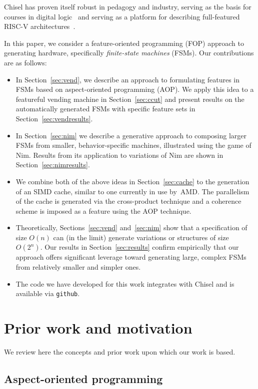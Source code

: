 \documentclass[conference]{IEEEtran}
\begin{document}
Chisel has proven itself robust in pedagogy and industry, serving as the basis for courses in digital logic~\cite{vlsicourse} and serving as a platform for describing full-featured RISC-V architectures~\cite{chisel:riscv}.  

In this paper, we consider a feature-oriented programming (FOP) approach to generating hardware, specifically \emph{finite-state machines} (FSMs).   Our contributions are as follows:
\begin{itemize}
    \item In Section~\ref{sec:vend}, we describe an approach to formulating features in FSMs based on aspect-oriented programming (AOP).  We apply this idea to a featureful vending machine in Section~\ref{sec:ccut} and present results on the automatically generated FSMs with specific feature sets in Section~\ref{sec:vendresults}.
    \item In Section~\ref{sec:nim} we describe a generative approach to composing larger FSMs from smaller, behavior-specific machines, illustrated using the game of Nim.  Results from its application to variations of Nim are shown in Section~\ref{sec:nimresults}.
    \item We combine both of the above ideas in Section~\ref{sec:cache} to the generation of an SIMD cache, similar to one currently in use by~AMD.  The parallelism of the cache is generated via the cross-product technique and a coherence scheme is imposed as a feature using the AOP technique.
    \item Theoretically, Sections~\ref{sec:vend} and~\ref{sec:nim} show that a specification of size $O(n)$ can (in the limit) generate variations or structures of size~$O(2^{n})$.  Our results in Section~\ref{sec:results} confirm empirically that our approach offers significant leverage toward generating large, complex FSMs from relatively smaller and simpler ones. 
    \item The code we have developed for this work integrates with Chisel and is available via \texttt{github}.
\end{itemize}


\section{Prior work and motivation}\label{sec:prior}

We review here the concepts and prior work upon which our work is based.
\subsection{Aspect-oriented programming}
\end{document}
